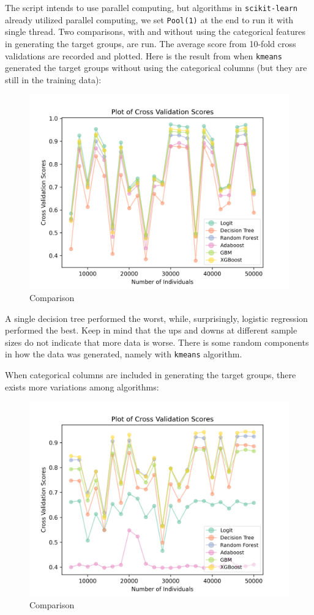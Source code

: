 \documentclass[
]{book}
\theoremstyle{definition}
\theoremstyle{definition}
\theoremstyle{definition}
\theoremstyle{definition}
\theoremstyle{remark}
\begin{document}
The script intends to use parallel computing, but algorithms in \texttt{scikit-learn} already utilized parallel computing, we set \texttt{Pool(1)} at the end to run it with single thread. Two comparisons, with and without using the categorical features in generating the target groups, are run. The average score from 10-fold cross validations are recorded and plotted. Here is the result from when \texttt{kmeans} generated the target groups without using the categorical columns (but they are still in the training data):

\begin{figure}
\centering
\includegraphics{images/comparison_true.png}
\caption{Comparison}
\end{figure}

A single decision tree performed the worst, while, surprisingly, logistic regression performed the best. Keep in mind that the ups and downs at different sample sizes do not indicate that more data is worse. There is some random components in how the data was generated, namely with \texttt{kmeans} algorithm.

When categorical columns are included in generating the target groups, there exists more variations among algorithms:

\begin{figure}
\centering
\includegraphics{images/comparison_false.png}
\caption{Comparison}
\end{figure}
\end{document}
